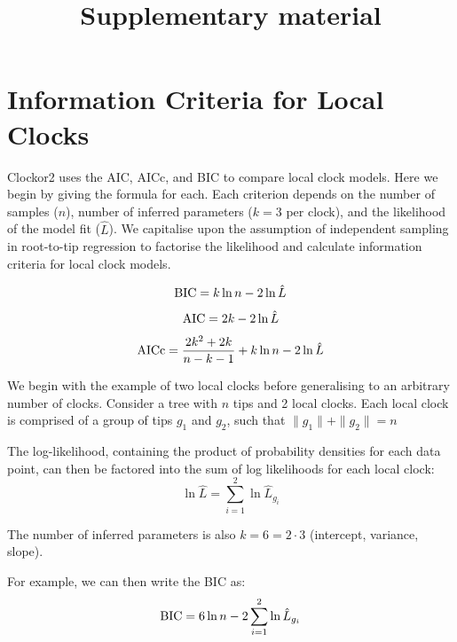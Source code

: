\documentclass{article}
\begin{document}
\title{Supplementary material}

\maketitle

\tableofcontents
\newpage
\renewcommand{\thefigure}{S\arabic{figure}}
\setcounter{figure}{0}

\section{Information Criteria for Local Clocks}
Clockor2 uses the AIC, AICc, and BIC to compare local clock models. Here we begin by giving the formula for each. Each criterion depends on the number of samples ($n$), number of inferred parameters ($k=3$ per clock), and the likelihood of the model fit ($\hat{L}$). We capitalise upon the assumption of independent sampling in root-to-tip regression to factorise the likelihood and calculate information criteria for local clock models.

\begin{equation}
    \textnormal{BIC} = k\ln{n} - 2\ln{\hat{L}}
\end{equation}
\begin{equation}
    \textnormal{AIC} = 2k - 2\ln{\hat{L}}
\end{equation}
\begin{equation}
    \textnormal{AICc} = \frac{2k^2+2k}{n-k-1} + k\ln{n} - 2\ln{\hat{L}}
\end{equation}

We begin with the example of two local clocks before generalising to an arbitrary number of clocks. Consider a tree with $n$ tips and 2 local clocks. Each local clock is comprised of a group of tips $g_1$ and $g_2$, such that $ \|g_1\| + \|g_2\| = n $

The log-likelihood, containing the product of probability densities for each data point, can then be factored into the sum of log likelihoods for each local clock:
\begin{equation}
    \ln{\hat{L}} = \sum_{i=1}^{2} \ln{\hat{L}_{g_{i}}}
\end{equation}

The number of inferred parameters is also $k = 6 = 2\cdot3$ (intercept, variance, slope).

For example, we can then write the BIC as:
\begin{equation}
    \textnormal{BIC} = 6\ln{n} - 2\sum_{i=1}^{2} \ln{\hat{L}_{g_{i}}}
\end{equation}
\end{document}
